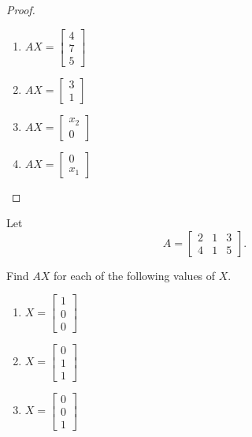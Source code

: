 \begin{proof}
    \begin{enumerate}[label={(\alph*)}]
        \item $AX = \begin{bmatrix}4 \\ 7 \\ 5\end{bmatrix}$
        \item $AX = \begin{bmatrix}3 \\ 1\end{bmatrix}$
        \item $AX = \begin{bmatrix}x_{2} \\ 0\end{bmatrix}$
        \item $AX = \begin{bmatrix}0 \\ x_{1}\end{bmatrix}$
    \end{enumerate}
\end{proof}

\begin{exercise}
    Let
    \[
        A = \begin{bmatrix}
            2 & 1 & 3 \\
            4 & 1 & 5
        \end{bmatrix}.
    \]

    Find $AX$ for each of the following values of $X$.
    \begin{enumerate}[label={(\alph*)}]
        \item $X = \begin{bmatrix}1 \\ 0 \\ 0\end{bmatrix}$
        \item $X = \begin{bmatrix}0 \\ 1 \\ 1\end{bmatrix}$
        \item $X = \begin{bmatrix}0 \\ 0 \\ 1\end{bmatrix}$
    \end{enumerate}
\end{exercise}

